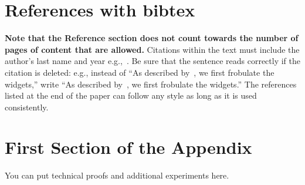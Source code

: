 \documentclass{article}
\begin{document}
\section*{References with bibtex}
{\bf Note that the Reference section does not count towards the number of pages of content that are allowed.}
Citations within the text must include the author's last name and year e.g.,~\citep{MachineLearningI}. Be sure that the sentence reads correctly if the citation is deleted: e.g., instead of “As described by~\citep{DudaHart2nd}, we first frobulate the widgets,” write “As described by~\citet{DudaHart2nd}, we first frobulate the widgets.” The references listed at the end of the paper can follow any style as long as it is used consistently.





\appendix
\section{First Section of the Appendix}
You can put technical proofs and additional experiments here.
\end{document}
